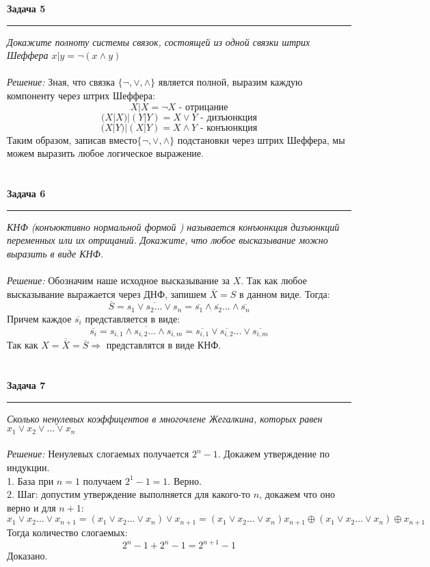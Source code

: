 \documentclass[12pt,a4paper]{scrartcl}
\begin{document}
\textbf{Задача 5}
\medskip\hrule\medskip
\textsl{
Докажите полноту системы связок, состоящей из одной связки штрих Шеффера $x | y = \neg(x \wedge y)$} \\ \\
\textit{Решение:} Зная, что связка $\{\neg, \vee, \wedge \}$ является полной, выразим каждую компоненту через штрих Шеффера: 
$$ 
X | X = \neg X \text{ - отрицание} 
$$
$$ 
(X | X) | (Y | Y) = X \vee Y \text{ - дизъюнкция} 
$$
$$ 
(X | Y) | (X | Y) = X \wedge Y \text{ - конъюнкция} 
$$
Таким образом, записав вместо$\{\neg, \vee, \wedge \}$ подстановки через штрих Шеффера, мы можем выразить любое логическое выражение. 
\\ \\ \\ 

\textbf{Задача 6} 
\medskip\hrule\medskip
\textsl{
КНФ (конъюктивно нормальной формой ) называется конъюнкция дизъюнкций переменных или их отрицаний. Докажите, что любое высказывание можно выразить в виде КНФ.} \\ \\
\textit{Решение:} Обозначим наше исходное высказывание за $X$. Так как любое высказывание выражается через ДНФ, запишем $\bar{X} = S$ в данном виде. Тогда:
$$
\overline{S} = \overline{s_1 \vee s_2 ... \vee s_n} = \overline{s_1} \wedge \overline{s_2} ... \wedge \overline{s_n}
$$  
Причем каждое $\overline{s_i}$ представляется в виде:
$$
\overline{s_i} = \overline{s_{i, 1} \wedge s_{i, 2} ... \wedge s_{i, m}} = \overline{s_{i, 1}} \vee \overline{s_{i, 2}} ... \vee \overline{s_{i, m}}
$$
Так как $X = \overline{\overline{X}} = \overline{S} \Rightarrow$ представлятся в виде КНФ.
\\ \\ \\


\textbf{Задача 7} 
\medskip\hrule\medskip
\textsl{
Сколько ненулевых коэффицентов в многочлене Жегалкина, которых равен $x_1 \vee x_2 \vee ... \vee x_n$} \\ \\
\textit{Решение:} 
Ненулевых слогаемых получается $2^n - 1$. Докажем утверждение по индукции. \\ 
1. База при $n = 1$ получаем $2^1 - 1 = 1$. Верно. \\
2. Шаг: допустим утверждение выполняется для какого-то $n$, докажем что оно верно и для $n + 1$:
$$
x_1 \vee x_2 ... \vee x_{n + 1} = (x_1 \vee x_2 ... \vee x_n) \vee x_{n + 1} = (x_1 \vee x_2 ... \vee x_n)x_{n + 1} \oplus (x_1 \vee x_2 ... \vee x_n) \oplus x_{n + 1}
$$
Тогда количество слогаемых:
$$
2^n - 1 + 2^n - 1 = 2^{n + 1} - 1
$$
Доказано.
\\ \\ \\
\end{document}
